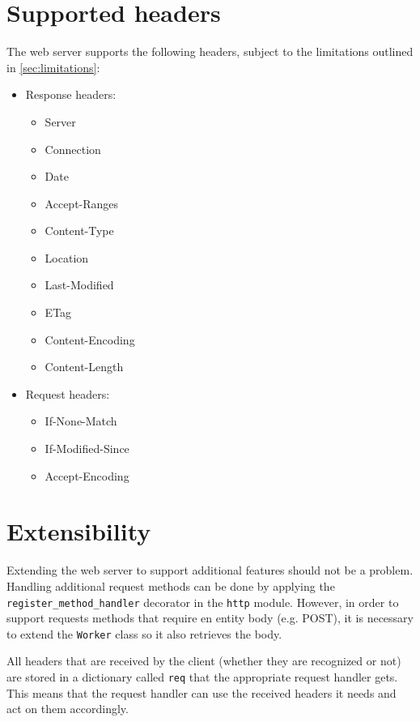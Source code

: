 \documentclass{sig-alternate}
\begin{document}
\section{Supported headers}

The web server supports the following headers, subject to the limitations
outlined in \autoref{sec:limitations}:

\begin{itemize}
    \item Response headers:
    \begin{itemize}
        \item Server
        \item Connection
        \item Date
        \item Accept-Ranges
        \item Content-Type
        \item Location
        \item Last-Modified
        \item ETag
        \item Content-Encoding
        \item Content-Length
    \end{itemize}
    \item Request headers:
    \begin{itemize}
        \item If-None-Match
        \item If-Modified-Since
        \item Accept-Encoding
    \end{itemize}
\end{itemize}


\section{Extensibility}

Extending the web server to support additional features should not be a
problem. Handling additional request methods can be done by applying the
\verb+register_method_handler+ decorator in the \verb+http+ module. However,
in order to support requests methods that require en entity body (e.g. POST),
it is necessary to extend the \verb+Worker+ class so it also retrieves the
body.

All headers that are received by the client (whether they are recognized or
not) are stored in a dictionary called \verb+req+ that the appropriate request
handler gets. This means that the request handler can use the received headers
it needs and act on them accordingly.
\end{document}
